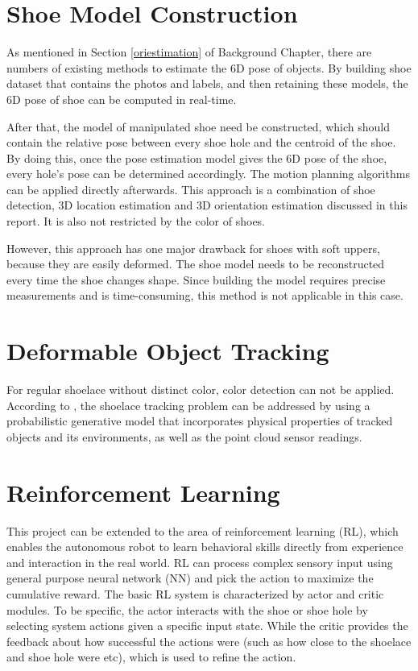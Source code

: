 \section{Shoe Model Construction}
As mentioned in Section \ref{oriestimation} of Background Chapter, there are numbers of existing methods to estimate the 6D pose of objects. By building shoe dataset that contains the photos and labels, and then retaining these models, the 6D pose of shoe can be computed in real-time. 

After that, the model of manipulated shoe need be constructed, which should contain the relative pose between every shoe hole and the centroid of the shoe. By doing this, once the pose estimation model gives the 6D pose of the shoe, every hole's pose can be determined accordingly. The motion planning algorithms can be applied directly afterwards. This approach is a combination of shoe detection, 3D location estimation and 3D orientation estimation discussed in this report. It is also not restricted by the color of shoes. 

However, this approach has one major drawback for shoes with soft uppers, because they are easily deformed. The shoe model needs to be reconstructed every time the shoe changes shape. Since building the model requires precise measurements and is time-consuming, this method is not applicable in this case.

\section{Deformable Object Tracking}
For regular shoelace without distinct color, color detection can not be applied. According to \citep{deformable_track}, the shoelace tracking problem can be addressed by using a probabilistic generative model that incorporates physical properties of tracked objects and its environments, as well as the point cloud sensor readings. 

\section{Reinforcement Learning}
This project can be extended to the area of reinforcement learning (RL), which enables the autonomous robot to learn behavioral skills directly from experience and interaction in the real world. RL can process complex sensory input using general purpose neural network (NN) and pick the action to maximize the cumulative reward. The basic RL system is characterized by actor and critic modules. To be specific, the actor interacts with the shoe or shoe hole by selecting system actions given a specific input state. While the critic provides the feedback about how successful the actions were (such as how close to the shoelace and shoe hole were etc), which is used to refine the action.

